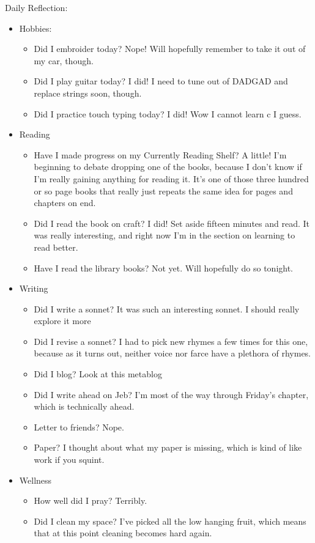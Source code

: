 \documentclass[12pt]{article}[titlepage]
\newcommand{\1}{\={a}}
\newcommand{\2}{\={e}}
\newcommand{\3}{\={\i}}
\newcommand{\4}{\=o}
\newcommand{\5}{\=u}
\newcommand{\6}{\={A}}
\renewcommand{\,}{\textsuperscript{,}}
\begin{document}
Daily Reflection:
\begin{itemize}
\item Hobbies:
\begin{itemize}
\item Did I embroider today? Nope! Will hopefully remember to take it out of my car, though.
\item Did I play guitar today? I did! I need to tune out of DADGAD and replace strings soon, though.
\item Did I practice touch typing today? I did! Wow I cannot learn c I guess.
\end{itemize}
\item Reading
\begin{itemize}
\item Have I made progress on my Currently Reading Shelf? A little! I'm beginning to debate dropping one of the books, because I don't know if I'm really gaining anything for reading it. It's one of those three hundred or so page books that really just repeats the same idea for pages and chapters on end.
\item Did I read the book on craft? I did! Set aside fifteen minutes and read. It was really interesting, and right now I'm in the section on learning to read better.
\item Have I read the library books? Not yet. Will hopefully do so tonight.
\end{itemize}
\item Writing
\begin{itemize}
\item Did I write a sonnet? It was such an interesting sonnet. I should really explore it more
\item Did I revise a sonnet? I had to pick new rhymes a few times for this one, because as it turns out, neither voice nor farce have a plethora of rhymes.
\item Did I blog? Look at this metablog
\item Did I write ahead on Jeb? I'm most of the way through Friday's chapter, which is technically ahead.
\item Letter to friends? Nope.
\item Paper? I thought about what my paper is missing, which is kind of like work if you squint.
\end{itemize}
\item Wellness
\begin{itemize}
\item How well did I pray? Terribly.
\item Did I clean my space? I've picked all the low hanging fruit, which means that at this point cleaning becomes hard again.

\end{itemize}
\end{itemize}
\end{document}
